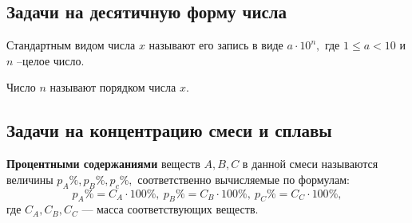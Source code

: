 \documentclass[a4paper, 12pt]{article}
\begin{document}
\subsection{Задачи на десятичную форму числа}
Стандартным видом числа $x$ называют его запись в виде $a\cdot 10^n,$ где $1\le a < 10$ и $n$ --целое число.

Число $n$ называют порядком числа $x.$ 

\subsection{Задачи на концентрацию смеси и сплавы}
\textbf{Процентными содержаниями} веществ $A, B, C$ в данной смеси называются величины $p_A\%, p_B\%, p_c\%,$ соответственно вычисляемые по формулам:
$$
p_A\%=C_A\cdot 100\%,\  p_B\%=C_B\cdot 100\%,\ p_C\%=C_C\cdot 100\%,
$$
где $C_A, C_B, C_C$ --- масса соответствующих веществ.
\end{document}
